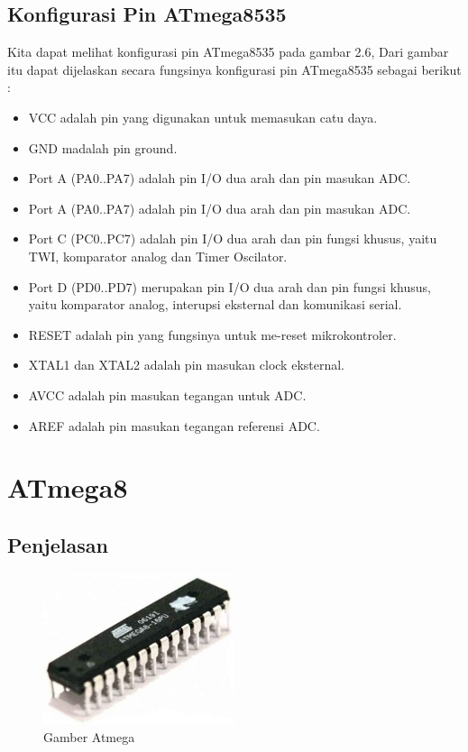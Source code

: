 		\subsection{Konfigurasi Pin ATmega8535}
		 Kita dapat melihat konfigurasi pin ATmega8535 pada gambar 2.6, Dari gambar itu dapat dijelaskan secara fungsinya konfigurasi pin ATmega8535 sebagai berikut :
		\begin{itemize}
			\item VCC adalah pin yang digunakan untuk memasukan catu daya.
			\item GND madalah pin ground.
			\item Port A (PA0..PA7) adalah pin I/O dua arah dan pin masukan ADC.
			\item Port A (PA0..PA7) adalah pin I/O dua arah dan pin masukan ADC.
			\item Port C (PC0..PC7) adalah pin I/O dua arah dan pin fungsi khusus, yaitu TWI, komparator analog dan Timer Oscilator.
			\item Port D (PD0..PD7) merupakan pin I/O dua arah dan pin fungsi khusus, yaitu komparator analog, interupsi eksternal dan komunikasi serial.
			\item RESET adalah pin yang fungsinya untuk me-reset mikrokontroler.
			\item XTAL1 dan XTAL2 adalah pin masukan clock eksternal.
			\item AVCC adalah pin masukan tegangan untuk ADC.
			\item AREF adalah pin masukan tegangan referensi ADC.
		\end{itemize}

\section{ATmega8}

	\subsection{Penjelasan}
		
		\begin{figure}[ht]
			\centerline{\includegraphics[width=0.5\textwidth]{figures/atmega8.jpg}}
			\caption{Gamber Atmega}
			\label{atmega8}
			\end{figure}
			
